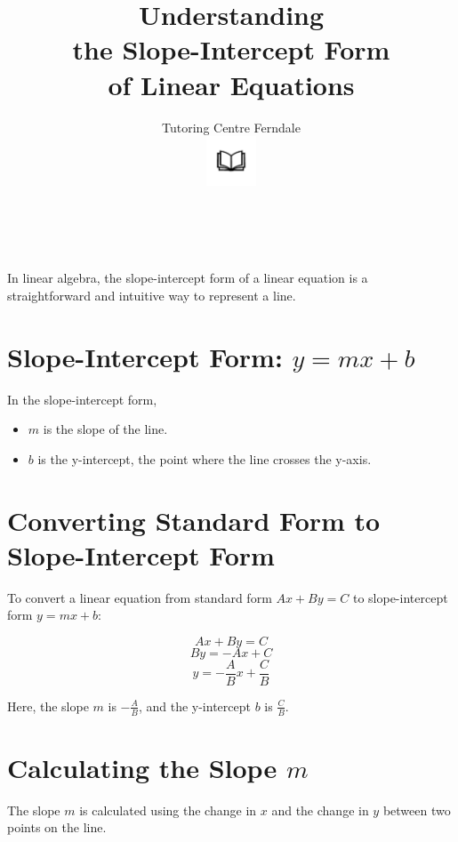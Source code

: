 \documentclass{article}
\begin{document}
\title{Understanding\\the Slope-Intercept Form\\of Linear Equations}\\
\author{Tutoring Centre Ferndale\\
\includegraphics[width=4em]{ApS_logo.png}}
\date{}
\maketitle

In linear algebra, the slope-intercept form of a linear equation is a straightforward and intuitive way to represent a line.

\section*{Slope-Intercept Form: \( y = mx + b \)}

In the slope-intercept form,
\begin{itemize}
    \item \( m \) is the slope of the line.
    \item \( b \) is the y-intercept, the point where the line crosses the y-axis.
\end{itemize}

\section*{Converting Standard Form to Slope-Intercept Form}

To convert a linear equation from standard form \( Ax + By = C \) to slope-intercept form \( y = mx + b \):

\[
Ax + By = C
\]
\[
By = -Ax + C
\]
\[
y = -\frac{A}{B}x + \frac{C}{B}
\]

Here, the slope \( m \) is \(-\frac{A}{B}\), and the y-intercept \( b \) is \(\frac{C}{B}\).

\newpage

\section*{Calculating the Slope \( m \)}

The slope \( m \) is calculated using the change in $x$ and the change in $y$ between two points on the line.\\
\end{document}
